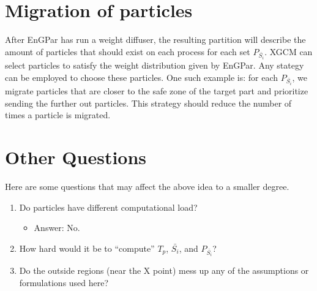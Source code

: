 \documentclass[a4paper]{article}
\begin{document}
{{  \section{Migration of particles}
  After EnGPar has run a weight diffuser, the resulting partition will
  describe the amount of particles that should exist on each process
  for each set $P_{\bar{S_i}}$. XGCM can select particles to satisfy the weight
  distribution given by EnGPar. Any stategy can be employed to choose
  these particles. One such example is: for each $P_{\bar{S_i}}$, we migrate particles
  that are closer to the safe zone of the target part and prioritize sending
  the further out particles. This strategy should reduce the number of times
  a particle is migrated.
  }
  
}

\section{Other Questions}
Here are some questions that may affect the above idea to a smaller degree.
\begin{enumerate}
\item Do particles have different computational load?
  {\color{red}
  \begin{itemize}
  \item Answer: No.
  \end{itemize}
  }
\item How hard would it be to ``compute'' $T_p$, $\bar{S_i}$, and $P_{\bar{S_i}}$?
\item Do the outside regions (near the X point) mess up any of the assumptions or formulations used here?
\end{enumerate}
\end{document}
